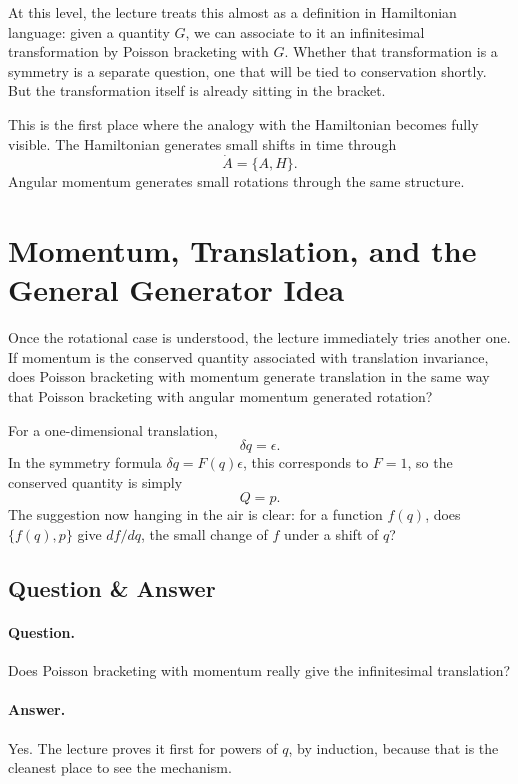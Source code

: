 At this level, the lecture treats this almost as a definition in Hamiltonian language: given a quantity \(G\), we can associate to it an infinitesimal transformation by Poisson bracketing with \(G\). Whether that transformation is a symmetry is a separate question, one that will be tied to conservation shortly. But the transformation itself is already sitting in the bracket.

This is the first place where the analogy with the Hamiltonian becomes fully visible. The Hamiltonian generates small shifts in time through
\[
\dot A=\{A,H\}.
\]
Angular momentum generates small rotations through the same structure.

\section{Momentum, Translation, and the General Generator Idea}

Once the rotational case is understood, the lecture immediately tries another one. If momentum is the conserved quantity associated with translation invariance, does Poisson bracketing with momentum generate translation in the same way that Poisson bracketing with angular momentum generated rotation?

For a one-dimensional translation,
\begin{equation}
\delta q=\epsilon.
\end{equation}
In the symmetry formula \(\delta q=F(q)\epsilon\), this corresponds to \(F=1\), so the conserved quantity is simply
\begin{equation}
Q=p.
\end{equation}
The suggestion now hanging in the air is clear: for a function \(f(q)\), does \(\{f(q),p\}\) give \(df/dq\), the small change of \(f\) under a shift of \(q\)?

\subsection{Question \& Answer}

\paragraph{Question.} Does Poisson bracketing with momentum really give the infinitesimal translation?

\paragraph{Answer.} Yes. The lecture proves it first for powers of \(q\), by induction, because that is the cleanest place to see the mechanism.

